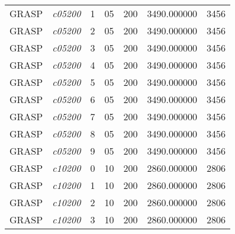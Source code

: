 {\begin{longtable}{cc|c|cc|cc}
			GRASP              & \textit{c05200}    & 1                               & 05               & 200              & 3490.000000                          & 3456 \\ 
			GRASP              & \textit{c05200}    & 2                               & 05               & 200              & 3490.000000                          & 3456 \\ 
			GRASP              & \textit{c05200}    & 3                               & 05               & 200              & 3490.000000                          & 3456 \\ 
			GRASP              & \textit{c05200}    & 4                               & 05               & 200              & 3490.000000                          & 3456 \\ 
			GRASP              & \textit{c05200}    & 5                               & 05               & 200              & 3490.000000                          & 3456 \\ 
			GRASP              & \textit{c05200}    & 6                               & 05               & 200              & 3490.000000                          & 3456 \\ 
			GRASP              & \textit{c05200}    & 7                               & 05               & 200              & 3490.000000                          & 3456 \\ 
			GRASP              & \textit{c05200}    & 8                               & 05               & 200              & 3490.000000                          & 3456 \\ 
			GRASP              & \textit{c05200}    & 9                               & 05               & 200              & 3490.000000                          & 3456 \\ \hline
			GRASP              & \textit{c10200}    & 0                               & 10               & 200              & 2860.000000                          & 2806 \\ 
			GRASP              & \textit{c10200}    & 1                               & 10               & 200              & 2860.000000                          & 2806 \\ 
			GRASP              & \textit{c10200}    & 2                               & 10               & 200              & 2860.000000                          & 2806 \\ 
			GRASP              & \textit{c10200}    & 3                               & 10               & 200              & 2860.000000                          & 2806 \\ 

\end{longtable}}
